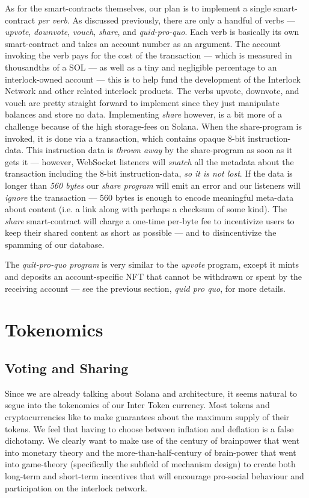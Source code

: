 \documentclass[a4paper]{article}
\begin{document}
As for the smart-contracts themselves, our plan is to implement a single smart-contract \emph{per verb}. As discussed previously, there are only a handful of verbs ---  \emph{upvote}, \emph{downvote}, \emph{vouch}, \emph{share}, and \emph{quid-pro-quo}. Each verb is basically its own smart-contract and takes an account number as an argument. The account invoking the verb pays for the cost of the transaction ---  which is measured in thousandths of a SOL ---  as well as a tiny and negligible percentage to an interlock-owned account ---  this is to help fund the development of the Interlock Network and other related interlock products. The verbs upvote, downvote, and vouch are pretty straight forward to implement since they just manipulate balances and store no data. Implementing \emph{share} however, is a bit more of a challenge because of the high storage-fees on Solana. When the share-program is invoked, it is done via a transaction, which contains opaque 8-bit instruction-data. This instruction data is \emph{thrown away} by the share-program as soon as it gets it ---  however, WebSocket listeners will \emph{snatch} all the metadata about the transaction including the 8-bit instruction-data, \emph{so it is not lost}. If the data is longer than \emph{560 bytes} our \emph{share program} will emit an error and our listeners will \emph{ignore} the transaction ---  560 bytes is enough to encode meaningful meta-data about content (i.e. a link along with perhaps a checksum of some kind). The \emph{share} smart-contract will charge a one-time per-byte fee to incentivize users to keep their shared content as short as possible ---  and to disincentivize the spamming of our database.

The \emph{quit-pro-quo program} is very similar to the \emph{upvote} program, except it mints and deposits an account-specific NFT that cannot be withdrawn or spent by the receiving account ---  see the previous section, \emph{quid pro quo}, for more details.
\section{Tokenomics}
\label{Tokenomics}
\subsection{Voting and Sharing}
\label{Voting and Sharing}

Since we are already talking about Solana and architecture, it seems natural to segue into the tokenomics of our Inter Token currency. Most tokens and cryptocurrencies like to make guarantees about the maximum supply of their tokens. We feel that having to choose between inflation and deflation is a false dichotamy. We clearly want to make use of the century of brainpower that went into monetary theory and the more-than-half-century of brain-power that went into game-theory (specifically the subfield of mechanism design) to create both long-term and short-term incentives that will encourage pro-social behaviour and participation on the interlock network.
\end{document}

